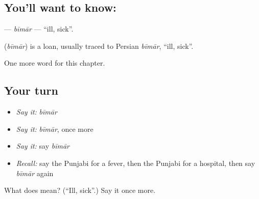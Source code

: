 \subsection*{You'll want to know: }
\textbf{} — \emph{bīmār} — \textquotedblleft{}ill, sick\textquotedblright{}.

\begin{cousinweb}
\textbf{} (\emph{bīmār}) is a loan, usually traced to Persian \emph{bīmār}, \textquotedblleft{}ill, sick\textquotedblright{}.
\end{cousinweb}

\begin{grammarlens}[title={What you've built}]
One more word for this chapter.
\end{grammarlens}

\subsection*{Your turn}
\begin{itemize}
\raggedright
  \item \emph{Say it:} \emph{bīmār}
  \item \emph{Say it:} \emph{bīmār}, once more
  \item \emph{Say it:} say \emph{bīmār}
  \item \emph{Recall:} say the Punjabi for a fever, then the Punjabi for a hospital, then say \emph{bīmār} again
\end{itemize}

\begin{tcolorbox}[breakable,colback=teal!4,colframe=teal!35!black,title={Before you move on}]
What does  mean? (\textquotedblleft{}Ill, sick\textquotedblright{}.) Say it once more.
\end{tcolorbox}
